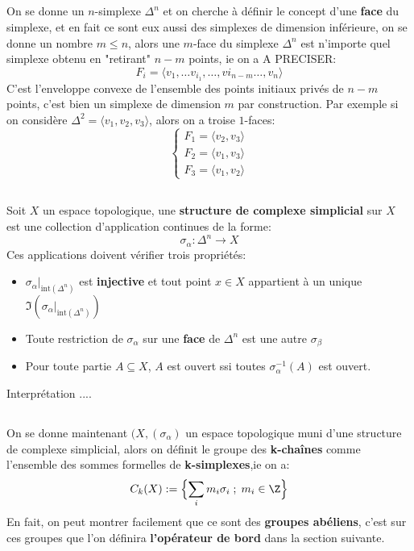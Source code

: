 \documentclass{report}
\begin{document}
\subsection*{}
On se donne un \(n\)-simplexe \(\Delta^n\) et on cherche à définir le concept d'une \textbf{face} du simplexe, et en fait ce sont eux aussi des simplexes de dimension inférieure, on se donne un nombre \(m \leq n\), alors une \(m\)-face du simplexe \(\Delta^n\) est n'importe quel simplexe obtenu en "retirant" \(n - m\) points, ie on a A PRECISER:
\[
   F_i = \langle v_1, \ldots v_{i_1}, \ldots, v{i_{n-m}} \ldots, v_n \rangle 
\]
C'est l'enveloppe convexe de l'ensemble des points initiaux privés de \(n - m\) points, c'est bien un simplexe de dimension \(m\) par construction. Par exemple si on considère \(\Delta^2 = \langle v_1, v_2, v_3 \rangle\), alors on a troise \(1\)-faces:
\[
   \begin{cases}
      F_1 = \langle v_2, v_3 \rangle\\
      F_2 = \langle v_1, v_3 \rangle\\
      F_3 = \langle v_1, v_2 \rangle
   \end{cases}
\]

\subsection*{}
Soit \(X\) un espace topologique, une \textbf{structure de complexe simplicial} sur \(X\) est une collection d'application continues de la forme:
\[
   \sigma_\alpha : \Delta^n \longrightarrow X
\]
Ces applications doivent vérifier trois propriétés:
\begin{itemize}
   \item \(\sigma_\alpha\vert_{\text{int}({\Delta^n})}\) est \textbf{injective} et tout point \(x \in X\) appartient à un unique \(\Im({\sigma_\alpha\vert_{\text{int}({\Delta^n})}})\)
   \item Toute restriction de \(\sigma_\alpha\) sur une \textbf{face} de \(\Delta^n\) est une autre \(\sigma_\beta\)
   \item Pour toute partie \(A \subseteq X\), \(A\) est ouvert ssi toutes \(\sigma_\alpha^{-1}(A)\) est ouvert.
\end{itemize}
Interprétation ....

\subsection*{}
On se donne maintenant \((X, (\sigma_\alpha)\) un espace topologique muni d'une structure de complexe simplicial, alors on définit le groupe des \textbf{k-chaînes} comme l'ensemble des sommes formelles de \textbf{k-simplexes},ie on a:
\[
   C_k(X) := \Bigl\{ \sum_{i} m_i\sigma_i\; ; \; m_i \in \Z\Bigl\}
\]
En fait, on peut montrer facilement que ce sont des \textbf{groupes abéliens}, c'est sur ces groupes que l'on définira \textbf{l'opérateur de bord} dans la section suivante.
\end{document}
